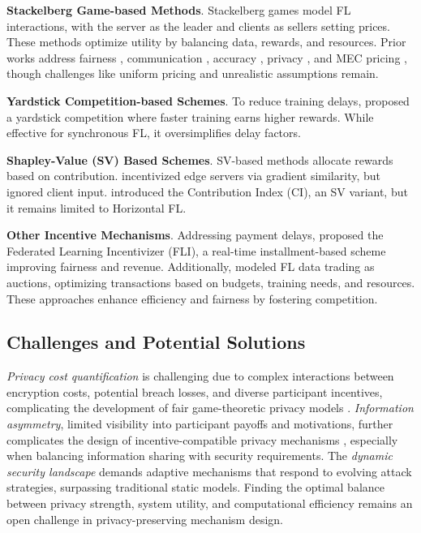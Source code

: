 \textbf{Stackelberg Game-based Methods}. 
Stackelberg games model FL interactions, with the server as the leader and clients as sellers setting prices. These methods optimize utility by balancing data, rewards, and resources. Prior works address fairness \cite{sarikaya2019motivating}, communication \cite{pandey2020crowdsourcing}, accuracy \cite{khan2020federated, luo2023incentive}, privacy \cite{hu2020trading}, and MEC pricing \cite{lee2020market}, though challenges like uniform pricing and unrealistic assumptions remain.


\textbf{Yardstick Competition-based Schemes}.
To reduce training delays, \citet{sarikaya2020regulating} proposed a yardstick competition where faster training earns higher rewards. While effective for synchronous FL, it oversimplifies delay factors.



\textbf{Shapley-Value (SV) Based Schemes}.
SV-based methods allocate rewards based on contribution. \citet{qu2020privacy} incentivized edge servers via gradient similarity, but ignored client input. \citet{song2019profit} introduced the Contribution Index (CI), an SV variant, but it remains limited to Horizontal FL.

\textbf{Other Incentive Mechanisms}.
Addressing payment delays, \citet{yu2020sustainable} proposed the Federated Learning Incentivizer (FLI), a real-time installment-based scheme improving fairness and revenue. Additionally, \cite{tang2023utility,tang2023competitive,tang2024bias,tang2023multi,tang2024cost,tang2024intelligent,tang2024stakeholder} modeled FL data trading as auctions, optimizing transactions based on budgets, training needs, and resources. These approaches enhance efficiency and fairness by fostering competition.



\subsection{Challenges and Potential Solutions}

\textit{Privacy cost quantification} is challenging due to complex interactions between encryption costs, potential breach losses, and diverse participant incentives, complicating the development of fair game-theoretic privacy models \cite{tang2024towards}. \textit{Information asymmetry}, limited visibility into participant payoffs and motivations, further complicates the design of incentive-compatible privacy mechanisms \cite{tang2024intelligent}, especially when balancing information sharing with security requirements. The \textit{dynamic security landscape} demands adaptive mechanisms that respond to evolving attack strategies, surpassing traditional static models. Finding the optimal balance between privacy strength, system utility, and computational efficiency remains an open challenge in privacy-preserving mechanism design.

